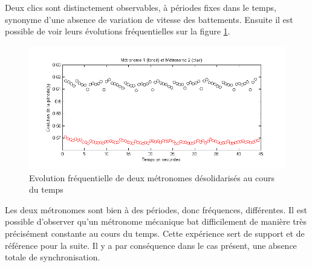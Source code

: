 \documentclass[a4paper,11pt]{report}
\begin{document}
Deux clics sont distinctement observables, à périodes fixes dans le temps, synonyme d'une absence de variation de vitesse des battements. Ensuite il est possible de voir leurs évolutions fréquentielles sur la figure \ref{CaractérisationF}.

\begin{figure}[h]
\centering
\includegraphics[width=1\textwidth]{Caracterisation_Frequence_200BPM}
\caption{Evolution fréquentielle de deux métronomes désolidarisés au cours du temps}\label{CaractérisationF}
\end{figure}

Les deux métronomes sont bien à des périodes, donc fréquences, différentes. Il est possible d'observer qu'un métronome mécanique bat difficilement de manière très précisément constante au cours du temps. Cette expérience sert de support et de référence pour la suite. Il y a par conséquence dans le cas présent, une absence totale de synchronisation.
\end{document}
